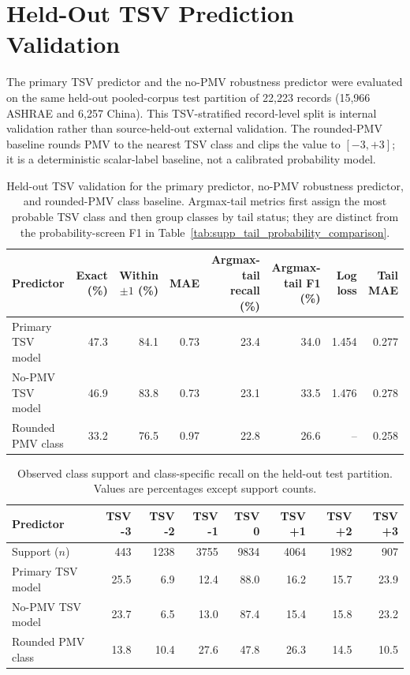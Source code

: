 \documentclass[11pt]{article}
\begin{document}
\section{Held-Out TSV Prediction Validation}

The primary TSV predictor and the no-PMV robustness predictor were evaluated on the same held-out pooled-corpus test partition of 22{,}223 records (15{,}966 ASHRAE and 6{,}257 China). This TSV-stratified record-level split is internal validation rather than source-held-out external validation. The rounded-PMV baseline rounds PMV to the nearest TSV class and clips the value to $[-3,+3]$; it is a deterministic scalar-label baseline, not a calibrated probability model.

\begin{table}[htbp]
\centering
\caption{Held-out TSV validation for the primary predictor, no-PMV robustness predictor, and rounded-PMV class baseline. Argmax-tail metrics first assign the most probable TSV class and then group classes by tail status; they are distinct from the probability-screen F1 in Table~\ref{tab:supp_tail_probability_comparison}.}
\label{tab:supp_tsv_validation}
\scriptsize
\setlength{\tabcolsep}{3.2pt}
\begin{tabular}{lrrrrrrr}
\toprule
Predictor & Exact (\%) & Within $\pm1$ (\%) & MAE & Argmax-tail recall (\%) & Argmax-tail F1 (\%) & Log loss & Tail MAE \\
\midrule
Primary TSV model & 47.3 & 84.1 & 0.73 & 23.4 & 34.0 & 1.454 & 0.277 \\
No-PMV TSV model & 46.9 & 83.8 & 0.73 & 23.1 & 33.5 & 1.476 & 0.278 \\
Rounded PMV class & 33.2 & 76.5 & 0.97 & 22.8 & 26.6 & -- & 0.258 \\
\bottomrule
\end{tabular}
\end{table}

\begin{table}[H]
\centering
\caption{Observed class support and class-specific recall on the held-out test partition. Values are percentages except support counts.}
\label{tab:supp_class_recall}
\scriptsize
\setlength{\tabcolsep}{4.2pt}
\begin{tabular}{lrrrrrrr}
\toprule
Predictor & TSV -3 & TSV -2 & TSV -1 & TSV 0 & TSV +1 & TSV +2 & TSV +3 \\
\midrule
Support ($n$) & 443 & 1238 & 3755 & 9834 & 4064 & 1982 & 907 \\
Primary TSV model & 25.5 & 6.9 & 12.4 & 88.0 & 16.2 & 15.7 & 23.9 \\
No-PMV TSV model & 23.7 & 6.5 & 13.0 & 87.4 & 15.4 & 15.8 & 23.2 \\
Rounded PMV class & 13.8 & 10.4 & 27.6 & 47.8 & 26.3 & 14.5 & 10.5 \\
\bottomrule
\end{tabular}
\end{table}
\end{document}
